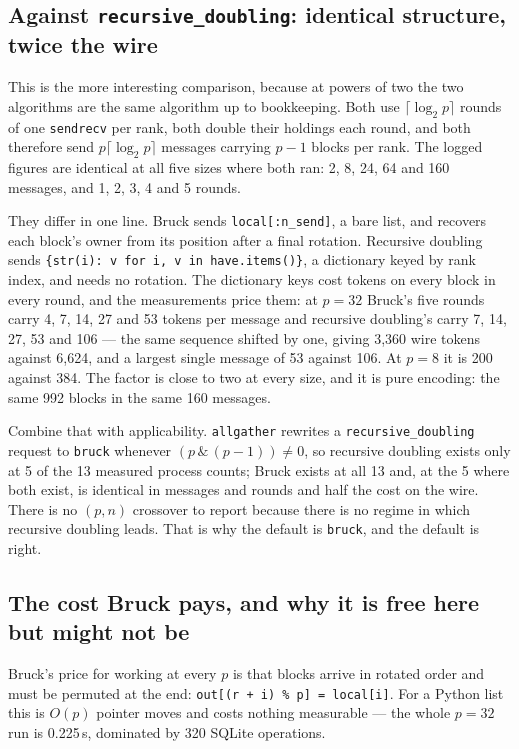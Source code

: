 \documentclass[11pt]{article}
\begin{document}
\subsection{Against \texttt{recursive\_doubling}: identical structure, twice the wire}

This is the more interesting comparison, because at powers of two the two algorithms are the same
algorithm up to bookkeeping. Both use $\lceil\log_2 p\rceil$ rounds of one \texttt{sendrecv} per
rank, both double their holdings each round, and both therefore send $p\lceil\log_2 p\rceil$
messages carrying $p-1$ blocks per rank. The logged figures are identical at all five sizes where
both ran: 2, 8, 24, 64 and 160 messages, and 1, 2, 3, 4 and 5 rounds.

They differ in one line. Bruck sends \texttt{local[:n\_send]}, a bare list, and recovers each
block's owner from its position after a final rotation. Recursive doubling sends
\texttt{\{str(i): v for i, v in have.items()\}}, a dictionary keyed by rank index, and needs no
rotation. The dictionary keys cost tokens on every block in every round, and the measurements
price them: at $p=32$ Bruck's five rounds carry 4, 7, 14, 27 and 53 tokens per message and
recursive doubling's carry 7, 14, 27, 53 and 106 --- the same sequence shifted by one, giving
3{,}360 wire tokens against 6{,}624, and a largest single message of 53 against 106. At $p=8$ it
is 200 against 384. The factor is close to two at every size, and it is pure encoding: the same
992 blocks in the same 160 messages.

Combine that with applicability. \texttt{allgather} rewrites a
\texttt{recursive\_doubling} request to \texttt{bruck} whenever $(p \,\&\, (p-1)) \ne 0$, so
recursive doubling exists only at 5 of the 13 measured process counts; Bruck exists at all 13
and, at the 5 where both exist, is identical in messages and rounds and half the cost on the
wire. There
is no $(p, n)$ crossover to report because there is no regime in which recursive doubling leads.
That is why the default is \texttt{bruck}, and the default is right.

\subsection{The cost Bruck pays, and why it is free here but might not be}

Bruck's price for working at every $p$ is that blocks arrive in rotated order and must be permuted
at the end: \texttt{out[(r + i) \% p] = local[i]}. For a Python list this is $O(p)$ pointer moves
and costs nothing measurable --- the whole $p=32$ run is 0.225\,s, dominated by 320 SQLite
operations.
\end{document}
